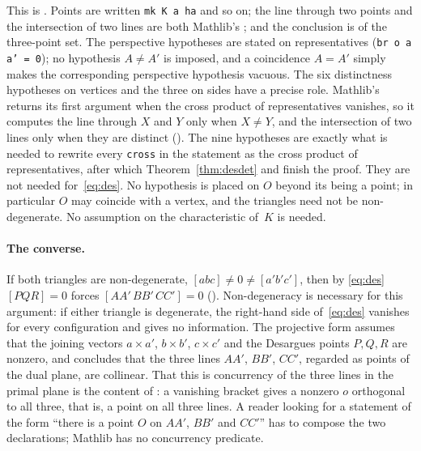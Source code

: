 \documentclass[11pt]{article}
\theoremstyle{definition}
\theoremstyle{remark}
\newcommand{\lean}[1]{\texttt{#1}}
\begin{document}
This is . Points are written \lean{mk K a ha} and so on; the line
through two points and the intersection of two lines are both Mathlib's
; and the conclusion is  of the
three-point set. The perspective hypotheses are stated on representatives
(\lean{br o a a' = 0}); no hypothesis $A\ne A'$ is imposed, and a coincidence $A=A'$ simply makes
the corresponding perspective hypothesis vacuous. The six distinctness hypotheses on vertices and the three on sides have a
precise role. Mathlib's  returns its first argument when the cross
product of representatives vanishes, so it computes the line through $X$ and $Y$ only when
$X\ne Y$, and the intersection of two lines only when they are distinct
(). The nine hypotheses are exactly what is needed to
rewrite every \lean{cross} in the statement as the cross product of representatives, after which
Theorem~\ref{thm:desdet} and  finish the proof. They
are not needed for~\eqref{eq:des}. No hypothesis is placed on $O$ beyond its being a point; in
particular $O$ may coincide with a vertex, and the triangles need not be non-degenerate. No
assumption on the characteristic of~$K$ is needed.

\paragraph{The converse.} If both triangles are non-degenerate, $[abc]\ne0\ne[a'b'c']$, then by
\eqref{eq:des} $[PQR]=0$ forces $[AA'\,BB'\,CC']=0$
(). Non-degeneracy is necessary for this argument: if
either triangle is degenerate, the right-hand side of~\eqref{eq:des} vanishes for every
configuration and gives no information. The projective form
 assumes that the joining vectors $a\times a'$, $b\times b'$,
$c\times c'$ and the Desargues points $P,Q,R$ are nonzero, and concludes that the three lines
$AA'$, $BB'$, $CC'$, regarded as points of the dual plane, are collinear. That this is concurrency
of the three lines in the primal plane is the content of
: a vanishing bracket gives a nonzero $o$
orthogonal to all three, that is, a point on all three lines. A reader looking for a statement of
the form ``there is a point $O$ on $AA'$, $BB'$ and $CC'$'' has to compose the two declarations;
Mathlib has no concurrency predicate.
\end{document}
